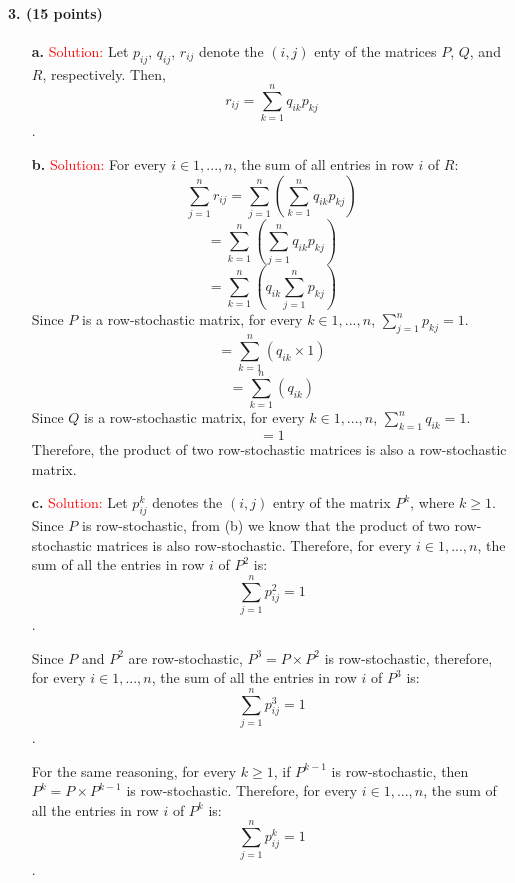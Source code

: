 \documentclass[11pt]{article} %
\begin{document}
\paragraph{3. (15 points)}  

\begin{itemize}
  \item[\textbf{a.}]
\textcolor{red}{Solution:}
Let $p_{ij}$, $q_{ij}$, $r_{ij}$ denote the $(i,j)$ enty of the matrices $P$, $Q$, and $R$, respectively. Then, $$r_{ij}=\sum_{k=1}^{n} q_{ik} p_{kj}$$.

  \item[\textbf{b.}]
\textcolor{red}{Solution:}
For every $i \in {1,...,n}$, the sum of all entries in row $i$ of $R$: 
$$ \sum_{j=1}^{n} r_{ij} = \sum_{j=1}^{n} (\sum_{k=1}^{n} q_{ik} p_{kj})$$
$$ =  \sum_{k=1}^{n} (\sum_{j=1}^{n} q_{ik} p_{kj}) $$ 
$$ =  \sum_{k=1}^{n} (q_{ik} \sum_{j=1}^{n} p_{kj}) $$ 
Since $P$ is a row-stochastic matrix, for every $k \in {1,...,n}$, $\sum_{j=1}^{n} p_{kj}=1$.
$$ =  \sum_{k=1}^{n} (q_{ik} \times 1) $$ 
$$ =  \sum_{k=1}^{n} (q_{ik}  ) $$ 
Since $Q$ is a row-stochastic matrix, for every $k \in {1,...,n}$, $\sum_{k=1}^{n} q_{ik}=1$.
$$ =  1 $$ 
Therefore, the product of two row-stochastic matrices is also a row-stochastic matrix.


  \item[\textbf{c.}]
\textcolor{red}{Solution:}
Let $p_{ij}^{k}$ denotes the $(i,j)$ entry of the matrix $ P^k$, where $k \ge 1$. Since $P$ is row-stochastic, from (b) we know that the product of two row-stochastic matrices is also row-stochastic. Therefore, for every $i \in {1,...,n}$, the sum of all the entries in row $i$ of $P^2$ is: $$ \sum_{j=1}^{n}  p_{ij}^{2}=1 $$.

Since $P$ and $P^2$ are row-stochastic, $P^3=P \times P^2$ is row-stochastic, therefore, for every $i \in {1,...,n}$, the sum of all the entries in row $i$ of $P^3$ is: $$ \sum_{j=1}^{n}p_{ij}^{3}=1 $$.

For the same reasoning, for every $k \ge 1$, if $P^{k-1}$ is row-stochastic, then $P^{k}=P \times P^{k-1}$ is row-stochastic. Therefore, for every $i \in {1,...,n}$, the sum of all the entries in row $i$ of $P^{k}$ is: $$ \sum_{j=1}^{n}  p_{ij}^{k}=1 $$.



\end{itemize}
\end{document}
